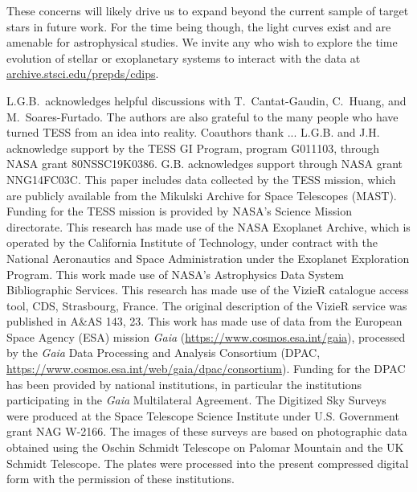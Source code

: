 \documentclass[12pt,twocolumn,tighten]{aastex62}
\newcommand{\stscilink}{\url{archive.stsci.edu/prepds/cdips}}
\begin{document}
These concerns will likely drive us to expand beyond the current
sample of target stars in future work.  For the time being though, 
the light curves exist and are amenable for astrophysical studies.  We
invite any who wish to explore the time evolution of stellar or
exoplanetary systems to interact with the data at \stscilink.



\acknowledgements
L.G.B.\ acknowledges helpful discussions with 
T.~Cantat-Gaudin,
C.~Huang,
and M.~Soares-Furtado.  The authors are also
grateful to the many people who have turned TESS from an idea into
reality.
%
Coauthors thank ... %
%
L.G.B. and J.H. acknowledge support by the TESS GI Program, program
G011103, through NASA grant 80NSSC19K0386.
%
G.B. acknowledges support through NASA grant NNG14FC03C.
%
This paper includes data collected by the TESS mission, which are
publicly available from the Mikulski Archive for Space Telescopes
(MAST).
%
Funding for the TESS mission is provided by NASA's Science Mission
directorate.
%
This research has made use of the NASA Exoplanet Archive, which is
operated by the California Institute of Technology, under contract
with the National Aeronautics and Space Administration under the
Exoplanet Exploration Program.
%
This work made use of NASA's Astrophysics Data System Bibliographic
Services.
%
This research has made use of the VizieR catalogue access tool, CDS,
Strasbourg, France. The original description of the VizieR service was
published in A\&AS 143, 23.
%
This work has made use of data from the European Space Agency (ESA)
mission {\it Gaia} (\url{https://www.cosmos.esa.int/gaia}), processed
by the {\it Gaia} Data Processing and Analysis Consortium (DPAC,
\url{https://www.cosmos.esa.int/web/gaia/dpac/consortium}). Funding
for the DPAC has been provided by national institutions, in particular
the institutions participating in the {\it Gaia} Multilateral
Agreement.
%
The Digitized Sky Surveys were produced at the Space Telescope Science
Institute under U.S. Government grant NAG W-2166. The images of these
surveys are based on photographic data obtained using the Oschin
Schmidt Telescope on Palomar Mountain and the UK Schmidt Telescope.
The plates were processed into the present compressed digital form
with the permission of these institutions.
%
\newline
%
\end{document}
